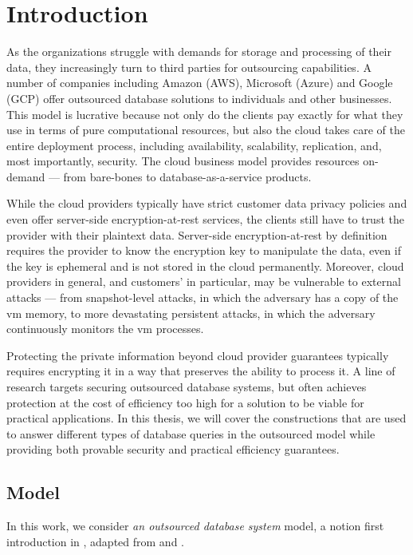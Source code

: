 \chapter{Introduction}
\thispagestyle{myheadings}

	As the organizations struggle with demands for storage and processing of their data, they increasingly turn to third parties for outsourcing capabilities.
	A number of companies including Amazon (AWS), Microsoft (Azure) and Google (GCP) offer outsourced database solutions to individuals and other businesses.
	This model is lucrative because not only do the clients pay exactly for what they use in terms of pure computational resources, but also the cloud takes care of the entire deployment process, including availability, scalability, replication, and, most importantly, security.
	The cloud business model provides resources on-demand --- from bare-bones  to database-as-a-service products.

	While the cloud providers typically have strict customer data privacy policies and even offer server-side encryption-at-rest services, the clients still have to trust the provider with their plaintext data.
	Server-side encryption-at-rest by definition requires the provider to know the encryption key to manipulate the data, even if the key is ephemeral and is not stored in the cloud permanently.
	Moreover, cloud providers in general, and customers'  in particular, may be vulnerable to external attacks --- from snapshot-level attacks, in which the adversary has a copy of the \acrshort{vm} memory, to more devastating persistent attacks, in which the adversary continuously monitors the \acrshort{vm} processes.

	Protecting the private information beyond cloud provider guarantees typically requires encrypting it in a way that preserves the ability to process it.
	A line of research targets securing outsourced database systems, but often achieves protection at the cost of efficiency too high for a solution to be viable for practical applications.
	In this thesis, we will cover the constructions that are used to answer different types of database queries in the outsourced model while providing both provable security and practical efficiency guarantees.

	\section{Model}

		In this work, we consider \emph{an outsourced database system} model, a notion first introduction in \cite{outsourced-db-intro}, adapted from \cite{generic-attacks-kellaris} and \cite{epsolute}.

